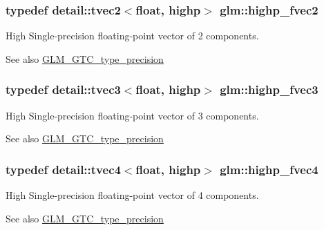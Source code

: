 \subsubsection[{\texorpdfstring{highp\+\_\+fvec2}{highp_fvec2}}]{\setlength{\rightskip}{0pt plus 5cm}typedef detail\+::tvec2$<$float, highp$>$ {\bf glm\+::highp\+\_\+fvec2}}\hypertarget{group__gtc__type__precision_gab58ecc53699d45f4f88d67bbff084c54}{}\label{group__gtc__type__precision_gab58ecc53699d45f4f88d67bbff084c54}
High Single-\/precision floating-\/point vector of 2 components. \begin{DoxySeeAlso}{See also}
\hyperlink{group__gtc__type__precision}{G\+L\+M\+\_\+\+G\+T\+C\+\_\+type\+\_\+precision} 
\end{DoxySeeAlso}
\subsubsection[{\texorpdfstring{highp\+\_\+fvec3}{highp_fvec3}}]{\setlength{\rightskip}{0pt plus 5cm}typedef detail\+::tvec3$<$float, highp$>$ {\bf glm\+::highp\+\_\+fvec3}}\hypertarget{group__gtc__type__precision_ga79b821fc8ae989b12bb43e2cd3932580}{}\label{group__gtc__type__precision_ga79b821fc8ae989b12bb43e2cd3932580}
High Single-\/precision floating-\/point vector of 3 components. \begin{DoxySeeAlso}{See also}
\hyperlink{group__gtc__type__precision}{G\+L\+M\+\_\+\+G\+T\+C\+\_\+type\+\_\+precision} 
\end{DoxySeeAlso}
\subsubsection[{\texorpdfstring{highp\+\_\+fvec4}{highp_fvec4}}]{\setlength{\rightskip}{0pt plus 5cm}typedef detail\+::tvec4$<$float, highp$>$ {\bf glm\+::highp\+\_\+fvec4}}\hypertarget{group__gtc__type__precision_gae0de2413648d89bf5a8e598e5520a439}{}\label{group__gtc__type__precision_gae0de2413648d89bf5a8e598e5520a439}
High Single-\/precision floating-\/point vector of 4 components. \begin{DoxySeeAlso}{See also}
\hyperlink{group__gtc__type__precision}{G\+L\+M\+\_\+\+G\+T\+C\+\_\+type\+\_\+precision} 
\end{DoxySeeAlso}
